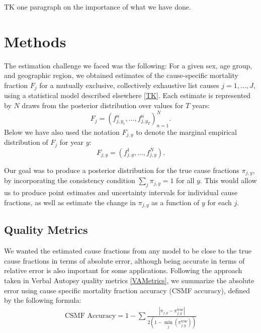   TK one paragraph on the importance of what we have done.


\section*{Methods}
The estimation challenge we faced was the following: For a given sex, age group,
and geographic region, we obtained estimates of the cause-specific
mortality fraction $F_j$ for a mutually exclusive, collectively
exhaustive list causes $j = 1,\ldots,J$, using a statistical model described elsewhere \ref{TK}.  Each estimate is
represented by $N$ draws from the posterior distribution over values
for $T$ years:
\[
F_j = \left(f_{j,y_1}^n, \ldots, f_{j,y_T}^n\right)_{n=1}^N.
\]
Below we have also used the notation $F_{j,y}$ to denote the marginal empirical distribution of $F_j$ for year $y$:
\[
F_{j,y} = \left(f_{j,y}^1, \ldots, f_{j,y}^N\right).
\]

Our goal was to produce a posterior distribution for the true cause
fractions $\pi_{j,y}$, by incorporating the consistency condition
$\sum_{j} \pi_{j,y}=1$ for all $y$.  This would allow us to produce
point estimates and uncertainty intervals for individual cause
fractions, as well as estimate the change in $\pi_{j,y}$ as a function
of $y$ for each $j$.

  \subsection*{Quality Metrics}
  We wanted the estimated cause fractions from any model to be close
  to the true cause fractions in terms of absolute error, although being
  accurate in terms of relative error is also important for some applications.
  Following the approach taken in Verbal Autopsy quality metrics
  \ref{VAMetrics}, we summarize the absolute error using cause
  specific mortality fraction accuracy (CSMF accuracy), defined by the
  following formula:
  \begin{align*}
    \text{CSMF Accuracy} = 1- \sum \frac{\left | \pi_{j,y} - \pi^{\text{true}}_{j,y} \right |}{2(1-\min_j(\pi^{\text{true}}_{j,y}))}
  \end{align*}

